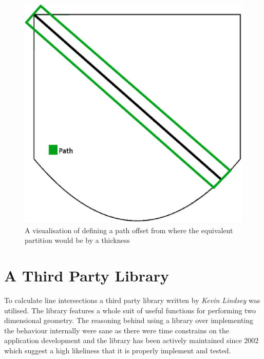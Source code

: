 \begin{figure}[H]
  \centering
    \includegraphics[width=\textwidth]{graphics/images/thickness.eps}
  \caption{A visualisation of defining a path offset from where the equivalent partition would be by a thickness}
  \label{fig:thickness}
  
\end{figure}


\section{A Third Party Library}
To calculate line intersections a third party library\cite{2dforyou} written by \emph{Kevin Lindsey} was utilised.  The library features a whole suit of useful functions for performing two dimensional geometry. The reasoning behind using a library over implementing the behaviour internally were sane as there were time constrains on the application development and the library has been actively maintained since 2002 which suggest a high likeliness that it is properly implement and tested.


























